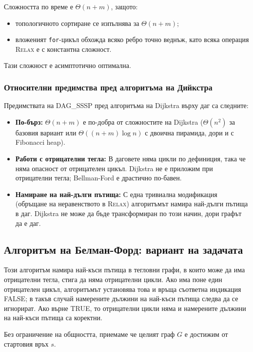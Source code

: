 \documentclass{article}
\renewcommand{\\}{\newline}
\begin{document}
Сложността по време е \(\Theta(n + m)\), защото:
\begin{itemize}
\item топологичното сортиране се изпълнява за \(\Theta(n + m)\);
\item вложеният \texttt{for}-цикъл обхожда всяко ребро точно веднъж, като всяка операция \textsc{Relax} е с константна сложност.
\end{itemize}
Тази сложност е асимптотично оптимална.

\subsubsection{Относителни предимства пред алгоритъма на Дийкстра}

Предимствата на DAG\_SSSP пред алгоритъма на Dijkstra върху даг са следните:

\begin{itemize}
\item \textbf{По-бърз:} \(\Theta(n + m)\) е по-добра от сложностите на Dijkstra (\(\Theta(n^2)\) за базовия вариант или \(\Theta((n+m)\log n)\) с двоична пирамида, дори и с Fibonacci heap).
\item \textbf{Работи с отрицателни тегла:} В даговете няма цикли по дефиниция, така че няма опасност от отрицателен цикъл. Dijkstra не е приложим при отрицателни тегла; Bellman-Ford е драстично по-бавен.
\item \textbf{Намиране на най-дълги пътища:} С една тривиална модификация (обръщане на неравенството в \textsc{Relax}) алгоритъмът намира най-дълги пътища в даг. Dijkstra не може да бъде трансформиран по този начин, дори графът да е даг.
\end{itemize}
\newpage
\subsection{Алгоритъм на Белман-Форд: вариант на задачата}

Този алгоритъм намира най-къси пътища в тегловни графи, в които може да има отрицателни тегла, стига да няма отрицателни цикли. Ако има поне един отрицателен цикъл, алгоритъмът установява това и връща съответна индикация FALSE; в такъв случай намерените дължини на най-къси пътища следва да се игнорират. Ако върне TRUE, то отрицателни цикли няма и намерените дължини на най-къси пътища са коректни.

Без ограничение на общността, приемаме че целият граф \(G\) е достижим от стартовия връх \(s\).
\end{document}
